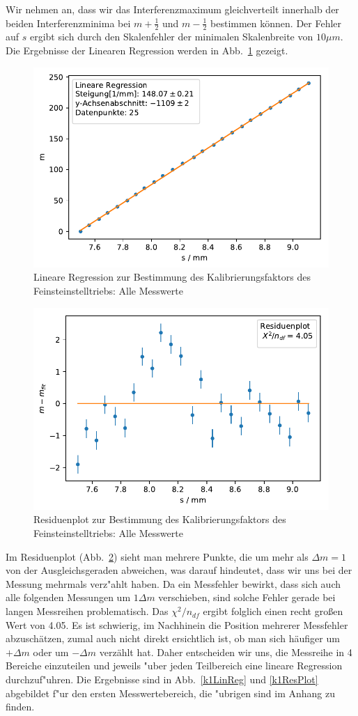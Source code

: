 \documentclass[12pt,a4paper]{article}
\begin{document}
Wir nehmen an, dass wir das Interferenzmaximum gleichverteilt innerhalb der beiden Interferenzminima bei $m+\frac{1}{2}$ und $m-\frac{1}{2}$ bestimmen können. Der Fehler auf $s$ ergibt sich durch den Skalenfehler der minimalen Skalenbreite von $10\mu m$. Die Ergebnisse der Linearen Regression werden in Abb.~\ref{kLinReg} gezeigt.
\begin{figure}[H]
	\centering
	\includegraphics[width=0.6\linewidth]{Python/Uebersetzungsfaktor_LinReg.pdf}
	\caption{Lineare Regression zur Bestimmung des Kalibrierungsfaktors des Feinsteinstelltriebs: Alle Messwerte}
	\label{kLinReg}
\end{figure}
\begin{figure}[H]
	\centering
	\includegraphics[width=0.6\linewidth]{Python/Uebersetzungsfaktor_Residuen.pdf}
	\caption{Residuenplot zur Bestimmung des Kalibrierungsfaktors des Feinsteinstelltriebs: Alle Messwerte}
	\label{kResPlot}
\end{figure}
Im Residuenplot (Abb.~\ref{kResPlot}) sieht man mehrere Punkte, die um mehr als $\Delta m=1$ von der Ausgleichsgeraden abweichen, was darauf hindeutet, dass wir uns bei der Messung mehrmals verz"ahlt haben. Da  ein Messfehler bewirkt, dass sich auch alle folgenden Messungen um $1\Delta m$ verschieben, sind solche Fehler gerade bei langen Messreihen problematisch. Das $\chi^2/n_{df}$ ergibt folglich einen recht großen Wert von 4.05. Es ist schwierig, im Nachhinein die Position mehrerer Messfehler abzuschätzen, zumal auch nicht direkt ersichtlich ist, ob man sich häufiger um $+\Delta m$ oder um $-\Delta m$ verzählt hat. Daher entscheiden wir uns, die Messreihe in 4 Bereiche einzuteilen und jeweils "uber jeden Teilbereich eine lineare Regression durchzuf"uhren. Die Ergebnisse sind in Abb.~\ref{k1LinReg} und \ref{k1ResPlot} abgebildet f"ur den ersten Messwertebereich, die "ubrigen sind im Anhang zu finden.
\end{document}
